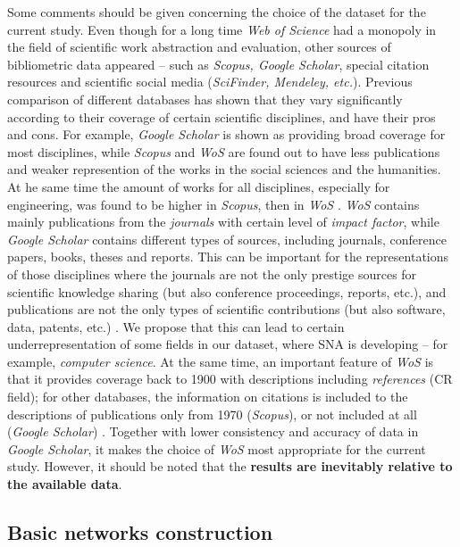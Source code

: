 \documentclass[11pt]{article} %
\begin{document}
Some comments should be given concerning the choice of the dataset for the current study. Even though for a long time \textit{Web of Science} had a monopoly in the field of scientific work abstraction and evaluation, other sources of bibliometric data appeared -- such as \textit{Scopus, Google Scholar}, special citation resources and scientific social media (\textit{SciFinder, Mendeley, etc.}). Previous comparison of different databases has shown that they vary significantly according to their coverage of certain scientific disciplines, and have their pros and cons. For example, \textit{Google Scholar} is shown as providing broad coverage for most disciplines, while \textit{Scopus} and \textit{WoS} are found out to have less publications and weaker represention of the works in the social sciences and the humanities. At he same time the amount of works for all disciplines,  especially for engineering, was found to be higher in \textit{Scopus}, then in \textit{WoS} \citep{hilbert, harzing, martin}. \textit{WoS} contains mainly publications from the \textit{journals} with certain level of \textit{impact factor}, while \textit{Google Scholar} contains different types of sources, including journals, conference papers, books, theses and reports. This can be important for the representations of those disciplines where the journals are not the only prestige sources for scientific knowledge sharing (but also conference proceedings, reports, etc.), and publications are not the only types of scientific contributions (but also software, data, patents, etc.) \citep{franceschet}. We propose that this can lead to certain underrepresentation of some fields in our dataset, where SNA is developing -- for example, \textit{computer science}. At the same time, an important feature of \textit{WoS} is that it provides coverage back to 1900 with descriptions including \textit{references} (CR field); for other databases, the information on citations is included to the descriptions of publications only from 1970 (\textit{Scopus}), or not included at all (\textit{Google Scholar}) \citep{elsevier,wos}. Together with lower consistency and accuracy of data in \textit{Google Scholar}, it makes the choice of \textit{WoS} most appropriate for the current study. However, it should be noted that the \textbf{results are inevitably relative to the available data}.  

\subsection{Basic networks construction}
\end{document}
